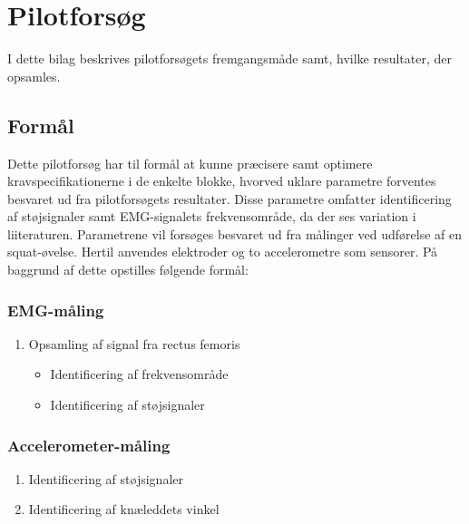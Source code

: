 \section{Pilotforsøg} \label{sec:pilotforsoeg}
I dette bilag beskrives pilotforsøgets fremgangsmåde samt, hvilke resultater, der opsamles. 

\subsection{Formål}
Dette pilotforsøg har til formål at kunne præcisere samt optimere kravspecifikationerne i de enkelte blokke, hvorved uklare parametre forventes besvaret ud fra pilotforsøgets resultater. Disse parametre omfatter identificering af støjsignaler samt EMG-signalets frekvensområde, da der ses variation i liiteraturen. Parametrene vil forsøges besvaret ud fra målinger ved udførelse af en squat-øvelse.
Hertil anvendes elektroder og to accelerometre som sensorer. På baggrund af dette opstilles følgende formål:  

\subsubsection{EMG-måling}
\begin{enumerate}
\item Opsamling af signal fra rectus femoris %
	\begin{itemize}
	\item Identificering af frekvensområde
	\item Identificering af støjsignaler 
	\end{itemize}
\end{enumerate}

\subsubsection{Accelerometer-måling}
\begin{enumerate}
\item Identificering af støjsignaler 
\item Identificering af knæleddets vinkel
\end{enumerate}

